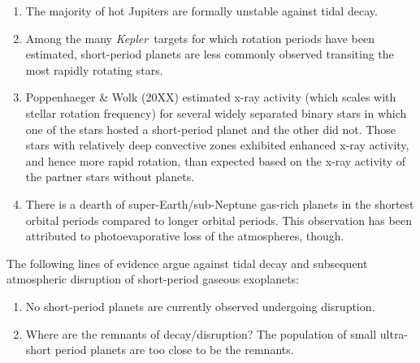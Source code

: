 \documentclass[smallcondensed]{svjour3}    %
\newcommand{\kepler}{\emph{Kepler}}
\begin{document}
\begin{enumerate}
\item The majority of hot Jupiters are formally unstable against tidal decay.

\item Among the many \kepler\ targets for which rotation periods have been estimated, short-period planets are less commonly observed transiting the most rapidly rotating stars.

\item Poppenhaeger \& Wolk (20XX) estimated x-ray activity (which scales with stellar rotation frequency) for several widely separated binary stars in which one of the stars hosted a short-period planet and the other did not. Those stars with relatively deep convective zones exhibited enhanced x-ray activity, and hence more rapid rotation, than expected based on the x-ray activity of the partner stars without planets. 

\item There is a dearth of super-Earth/sub-Neptune gas-rich planets in the shortest orbital periods compared to longer orbital periods. This observation has been attributed to photoevaporative loss of the atmospheres, though.

\end{enumerate}

The following lines of evidence argue against tidal decay and subsequent atmospheric disruption of short-period gaseous exoplanets:

\begin{enumerate}

\item No short-period planets are currently observed undergoing disruption.

\item Where are the remnants of decay/disruption? The population of small ultra-short period planets are too close to be the remnants.

\end{enumerate}
\end{document}
